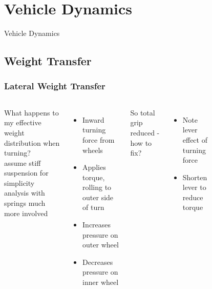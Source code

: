 \documentclass{beamer}
\begin{document}
\section{Vehicle Dynamics} %
\begin{frame}
\centering \huge Vehicle Dynamics
\end{frame}

\subsection{Weight Transfer}

\begin{frame}
\frametitle{Lateral Weight Transfer}
\begin{columns}[t]
  What happens to my effective weight distribution when turning? \\
  {\scriptsize assume stiff suspension for simplicity} \\
  {\scriptsize analysis with springs much more involved}
   {
  \begin{itemize}
    \item Inward turning force from wheels
    \item Applies torque, rolling to outer side of turn
    \item Increases pressure on outer wheel
    \item Decreases pressure on inner wheel
  \end{itemize}
  \vspace{\baselineskip}
  So total grip reduced - how to fix?
  }
   {
  \begin{itemize}
    \item Note lever effect of turning force
    \item Shorten lever to reduce torque
  \end{itemize}
  }
  \begin{figure}
    \centering

\end{figure}
\end{columns}
\end{frame}
\end{document}
